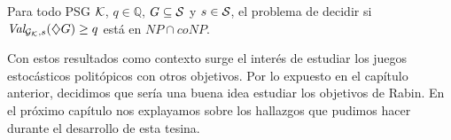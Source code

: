 \begin{theorem}
	Para todo PSG $\mathcal{K}$, $q \in \mathbb{Q}$, $G \subseteq \mathcal{S}$ y $s \in \mathcal{S}$, el problema de decidir si $\textit{Val}_{\mathcal{G}_{\mathcal{K}}, s}(\diamondsuit G) \geq q$ está en $NP \cap coNP$.
\end{theorem}

Con estos resultados como contexto surge el interés de estudiar los juegos
estocásticos politópicos con otros objetivos. Por lo expuesto en el capítulo
anterior, decidimos que sería una buena idea estudiar los objetivos de Rabin.
En el próximo capítulo nos explayamos sobre los hallazgos que pudimos hacer
durante el desarrollo de esta tesina.




